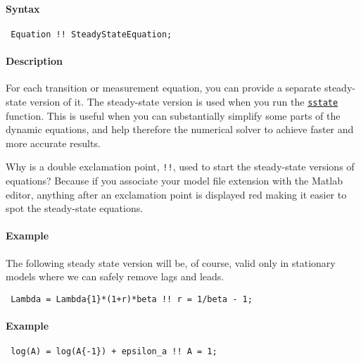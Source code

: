 


	\paragraph{Syntax}
 
 \begin{verbatim}
 Equation !! SteadyStateEquation;
 \end{verbatim}
 
 \paragraph{Description}
 
 For each transition or measurement equation, you can provide a separate
 steady-state version of it. The steady-state version is used when you
 run the \href{model/sstate}{\texttt{sstate}} function. This is useful
 when you can substantially simplify some parts of the dynamic equations,
 and help therefore the numerical solver to achieve faster and more
 accurate results.
 
 Why is a double exclamation point, \texttt{!!}, used to start the
 steady-state versions of equations? Because if you associate your model
 file extension with the Matlab editor, anything after an exclamation
 point is displayed red making it easier to spot the steady-state
 equations.
 
 \paragraph{Example}
 
 The following steady state version will be, of course, valid only in
 stationary models where we can safely remove lags and leads.
 
 \begin{verbatim}
 Lambda = Lambda{1}*(1+r)*beta !! r = 1/beta - 1;
 \end{verbatim}
 
 \paragraph{Example}
 
 \begin{verbatim}
 log(A) = log(A{-1}) + epsilon_a !! A = 1;
 \end{verbatim}


